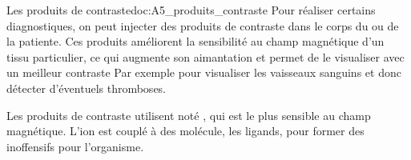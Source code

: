 

\begin{doc}{Les produits de contraste}{doc:A5_produits_contraste}
  Pour réaliser certains diagnostiques, on peut injecter des produits de contraste dans le corps du ou de la patiente.
  Ces produits améliorent la sensibilité au champ magnétique d'un tissu particulier, ce qui augmente son aimantation et permet de le visualiser avec un meilleur contraste
  Par exemple pour visualiser les vaisseaux sanguins et donc détecter d'éventuels thromboses.

  Les produits de contraste utilisent  noté , qui est le plus sensible au champ magnétique.
  L'ion est couplé à des molécule, les ligands, pour former des  inoffensifs pour l'organisme.

  \begin{center}
     \\[6pt]
  \end{center}
\end{doc}





